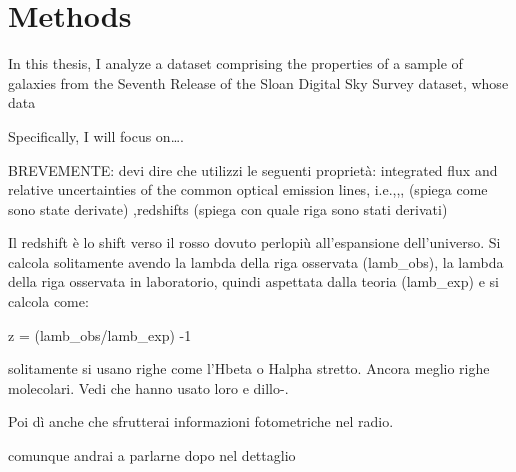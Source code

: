 \chapter{Methods}
 In this thesis, I analyze a dataset comprising the properties of a sample of galaxies from the Seventh Release of the Sloan Digital Sky Survey dataset, whose data 

 
 Specifically, I will focus on…. 


BREVEMENTE:
devi dire che utilizzi le seguenti proprietà: 
integrated flux and relative uncertainties of the common optical emission lines, i.e.,,,
(spiega come sono state derivate)
,redshifts (spiega con quale riga sono stati derivati)

Il redshift è lo shift verso il rosso dovuto perlopiù all’espansione dell’universo.
Si calcola solitamente avendo la lambda della riga osservata (lamb_obs), la lambda della riga osservata in laboratorio, quindi aspettata dalla teoria (lamb_exp) e si calcola come:

z = (lamb_obs/lamb_exp) -1

solitamente si usano righe come l’Hbeta o Halpha stretto. Ancora meglio righe molecolari. Vedi che hanno usato loro e dillo-.

Poi dì anche che sfrutterai informazioni fotometriche nel radio.

comunque andrai a parlarne dopo nel dettaglio 

